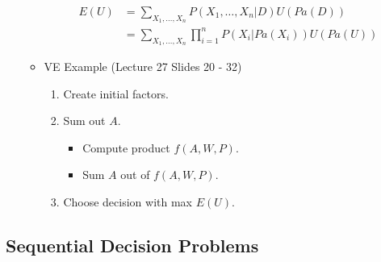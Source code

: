 \documentclass{article}
\begin{document}
\begin{itemize}
\begin{itemize}
                \begin{align*}
                    E(U) &= \sum\limits_{X_1, \ldots, X_n} P(X_1, \ldots, X_n|D)U(Pa(D)) \\
                    &= \sum\limits_{X_1, \ldots, X_n} \prod\limits_{i=1}^{n} P(X_i|Pa(X_i))U(Pa(U))
                \end{align*}
            \item VE Example (Lecture 27 Slides 20 - 32)
                \begin{enumerate}
                    \item Create initial factors.
                    \item Sum out $A$.
                        \begin{itemize}
                            \item Compute product $f(A, W, P)$.
                            \item Sum $A$ out of $f(A, W, P)$.
                        \end{itemize}
                    \item Choose decision with max $E(U)$.
                \end{enumerate}
        \end{itemize}
\end{itemize}

\subsection{Sequential Decision Problems}
\end{document}
